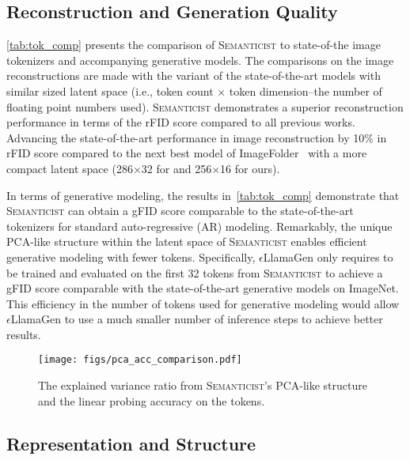 \documentclass[10pt,twocolumn,letterpaper]{article}
\DeclareRobustCommand{\modelname}{\textsc{Semanticist}\xspace}
\DeclareRobustCommand{\armodelname}{$\epsilon$LlamaGen\xspace}
\begin{document}
\subsection{Reconstruction and Generation Quality}

\cref{tab:tok_comp} presents the comparison of \modelname to state-of-the image tokenizers and accompanying generative models.
The comparisons on the image reconstructions are made with the variant of the state-of-the-art models with similar sized latent space (i.e., token count $\times$ token dimension--the number of floating point numbers used).
\modelname demonstrates a superior reconstruction performance in terms of the rFID score compared to all previous works.
Advancing the state-of-the-art performance in image reconstruction by 10\% in rFID score compared to the next best model of ImageFolder~\cite{imagefolder} with a more compact latent space (286$\times$32 for \cite{imagefolder} and 256$\times$16 for ours).

In terms of generative modeling, the results in~\cref{tab:tok_comp} demonstrate that \modelname can obtain a gFID score comparable to the state-of-the-art tokenizers for standard auto-regressive (AR) modeling.
Remarkably, the unique PCA-like structure within the latent space of \modelname enables efficient generative modeling with fewer tokens.
Specifically, \armodelname only requires to be trained and evaluated on the first 32 tokens from \modelname to achieve a gFID score comparable with the state-of-the-art generative models on ImageNet.
This efficiency in the number of tokens used for generative modeling would allow \armodelname to use a much smaller number of inference steps to achieve better results.

\begin{figure}
    \centering
    \texttt{[image: figs/pca\_acc\_comparison.pdf]}
    \vspace{-1em}
    \caption{The explained variance ratio from \modelname's PCA-like structure and the linear probing accuracy on the tokens.}
    \label{fig:pca_acc}
\end{figure}











\subsection{Representation and Structure}
\end{document}

